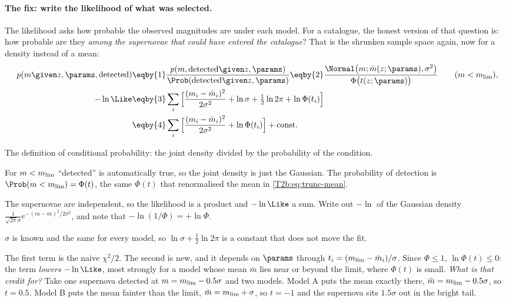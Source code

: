 \paragraph{The fix: write the likelihood of what was selected.} The likelihood asks how probable the observed magnitudes are under each model. For a catalogue, the honest version of that question is: how probable are they \emph{among the supernovae that could have entered the catalogue}? That is the shrunken sample space again, now for a density instead of a mean:
\begin{align}
  p(m\given z,\params,\text{detected})
  &\eqby{1}\frac{p(m,\text{detected}\given z,\params)}{\Prob(\text{detected}\given z,\params)}
  \eqby{2}\frac{\Normal\big(m;\bar m(z;\params),\sigma^2\big)}{\Phi\big(t(z;\params)\big)}\qquad(m<m_{\rm lim}),\nonumber\\
  -\ln\Like
  &\eqby{3}\sum_i\Big[\frac{(m_i-\bar m_i)^2}{2\sigma^2}+\ln\sigma+\tfrac12\ln2\pi+\ln\Phi(t_i)\Big]\nonumber\\
  &\eqby{4}\sum_i\Big[\frac{(m_i-\bar m_i)^2}{2\sigma^2}+\ln\Phi(t_i)\Big]+\text{const}.
  \label{T2b:eq:trunc-like}
\end{align}
\begin{explain}
  \item The definition of conditional probability: the joint density divided by the probability of the condition.
  \item For $m<m_{\rm lim}$ ``detected'' is automatically true, so the joint density is just the Gaussian. The probability of detection is $\Prob(m<m_{\rm lim})=\Phi(t)$, the same $\Phi(t)$ that renormalised the mean in \eqref{T2b:eq:trunc-mean}.
  \item The supernovae are independent, so the likelihood is a product and $-\ln\Like$ a sum. Write out $-\ln$ of the Gaussian density $\frac{1}{\sqrt{2\pi}\sigma}e^{-(m-\bar m)^2/2\sigma^2}$, and note that $-\ln(1/\Phi)=+\ln\Phi$.
  \item $\sigma$ is known and the same for every model, so $\ln\sigma+\frac12\ln2\pi$ is a constant that does not move the fit.
\end{explain}
The first term is the naive $\chi^2/2$. The second is new, and it depends on $\params$ through $t_i=(m_{\rm lim}-\bar m_i)/\sigma$. Since $\Phi\le1$, $\ln\Phi(t)\le0$: the term \emph{lowers} $-\ln\Like$, most strongly for a model whose mean $\bar m$ lies near or beyond the limit, where $\Phi(t)$ is small. \emph{What is that credit for?} Take one supernova detected at $m=m_{\rm lim}-0.5\sigma$ and two models. Model A puts the mean exactly there, $\bar m=m_{\rm lim}-0.5\sigma$, so $t=0.5$. Model B puts the mean fainter than the limit, $\bar m=m_{\rm lim}+\sigma$, so $t=-1$ and the supernova sits $1.5\sigma$ out in the bright tail.
